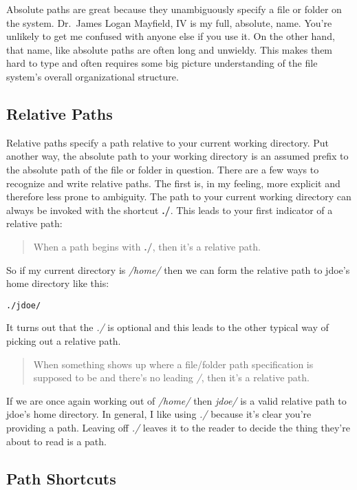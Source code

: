 \documentclass[nobib]{tufte-handout}
\begin{document}
Absolute paths are great because they unambiguously specify a file or folder on the system. Dr.\ James Logan Mayfield, IV is my full, absolute, name. You're unlikely to get me confused with anyone else if you use it. On the other hand, that name, like absolute paths are often long and unwieldy. This makes them hard to type and often requires some big picture understanding of the file system's overall organizational structure.

\subsection{Relative Paths}

Relative paths specify a path relative to your current working directory. Put another way, the absolute path to your working directory is an assumed prefix to the absolute path of the file or folder in question.  There are a few ways to recognize and write relative paths.  The first is, in my feeling, more explicit and therefore less prone to ambiguity. The path to your current working directory can always be invoked with the shortcut \textbf{./}. This leads to your first indicator of a relative path:
\begin{quote}
When a path begins with \textbf{./}, then it's a relative path.
\end{quote}
So if my current directory is \textit{/home/} then we can form the relative path to jdoe's home directory like this:
\begin{verbatim}
./jdoe/
\end{verbatim}
It turns out that the \textit{./} is optional and this leads to the other typical way of picking out a relative path.
\begin{quote}
When something shows up where a file/folder path specification is supposed to be and there's no leading \textit{/}, then it's a relative path.
\end{quote}
If we are once again working out of \textit{/home/} then \textit{jdoe/} is a valid relative path to jdoe's home directory.  In general, I like using \textit{./} because it's clear you're providing a path. Leaving off \textit{./} leaves it to the reader to decide the thing they're about to read is a path.

\subsection{Path Shortcuts}
\end{document}
